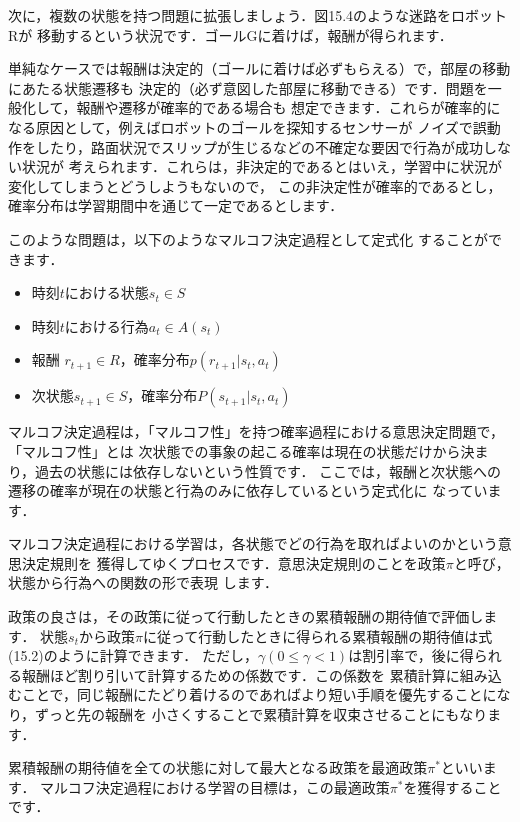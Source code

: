 
次に，複数の状態を持つ問題に拡張しましょう．図15.4のような迷路をロボットRが
移動するという状況です．ゴールGに着けば，報酬が得られます．

単純なケースでは報酬は決定的（ゴールに着けば必ずもらえる）で，部屋の移動にあたる状態遷移も
決定的（必ず意図した部屋に移動できる）です．問題を一般化して，報酬や遷移が確率的である場合も
想定できます．これらが確率的になる原因として，例えばロボットのゴールを探知するセンサーが
ノイズで誤動作をしたり，路面状況でスリップが生じるなどの不確定な要因で行為が成功しない状況が
考えられます．これらは，非決定的であるとはいえ，学習中に状況が変化してしまうとどうしようもないので，
この非決定性が確率的であるとし，確率分布は学習期間中を通じて一定であるとします．

このような問題は，以下のようなマルコフ決定過程として定式化
することができます．

\begin{itemize}
\item 時刻$t$における状態$s_t \in S$
\item 時刻$t$における行為$a_t \in A(s_t)$
\item 報酬 $r_{t+1} \in R$，確率分布$p(r_{t+1}|s_t, a_t)$
\item 次状態$s_{t+1} \in S$，確率分布$P(s_{t+1}|s_t, a_t)$
\end{itemize}

マルコフ決定過程は，「マルコフ性」を持つ確率過程における意思決定問題で，「マルコフ性」とは
次状態での事象の起こる確率は現在の状態だけから決まり，過去の状態には依存しないという性質です．
ここでは，報酬と次状態への遷移の確率が現在の状態と行為のみに依存しているという定式化に
なっています．


マルコフ決定過程における学習は，各状態でどの行為を取ればよいのかという意思決定規則を
獲得してゆくプロセスです．意思決定規則のことを政策$\pi$と呼び，状態から行為への関数の形で表現
します．

政策の良さは，その政策に従って行動したときの累積報酬の期待値で評価します．
状態$s_t$から政策$\pi$に従って行動したときに得られる累積報酬の期待値は式(15.2)のように計算できます．
ただし，$\gamma (0 \le \gamma < 1)$は割引率で，後に得られる報酬ほど割り引いて計算するための係数です．この係数を
累積計算に組み込むことで，同じ報酬にたどり着けるのであればより短い手順を優先することになり，ずっと先の報酬を
小さくすることで累積計算を収束させることにもなります．

累積報酬の期待値を全ての状態に対して最大となる政策を最適政策$\pi^*$といいます．
マルコフ決定過程における学習の目標は，この最適政策$\pi^*$を獲得することです．

